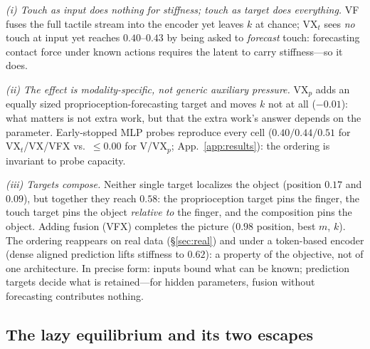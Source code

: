 \documentclass{article} %
\begin{document}
\emph{(i) Touch as input does nothing for stiffness; touch as target does
everything.} VF fuses the full tactile stream into the encoder yet leaves $k$
at chance; VX$_t$ sees \emph{no} touch at input yet reaches $0.40$--$0.43$ by
being asked to \emph{forecast} touch: forecasting contact force under known
actions requires the latent to carry stiffness---so it does.

\emph{(ii) The effect is modality-specific, not generic auxiliary pressure.}
VX$_p$ adds an equally sized proprioception-forecasting target and moves $k$
not at all ($-0.01$): what matters is not extra work, but that the extra
work's answer depends on the parameter. Early-stopped MLP probes reproduce
every cell ($0.40/0.44/0.51$ for VX$_t$/VX/VFX vs.\ $\le 0.00$ for V/VX$_p$;
App.~\ref{app:results}): the ordering is invariant to probe capacity.

\emph{(iii) Targets compose.} Neither single target localizes the object
(position $0.17$ and $0.09$), but together they reach $0.58$: the
proprioception target pins the finger, the touch target pins the object
\emph{relative to} the finger, and the composition pins the object. Adding
fusion (VFX) completes the picture ($0.98$ position, best $m$, $k$). The
ordering reappears on real data (\S\ref{sec:real}) and under a token-based
encoder (dense aligned prediction lifts stiffness to $0.62$): a property of
the objective, not of one architecture. In precise form: inputs bound what can be known; prediction targets decide
what is retained---for hidden parameters, fusion without forecasting
contributes nothing.

\subsection{The lazy equilibrium and its two escapes}
\label{sec:lazy}
\end{document}
